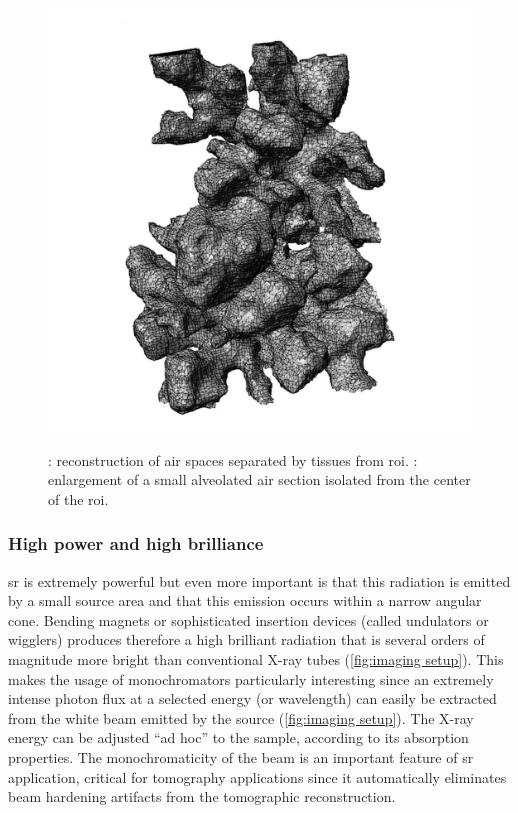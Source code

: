 \begin{figure}
{{			\includegraphics[width=\imsize]{img/Tsuda2008/Tsuda-09b}%
			\label{subfig:tsuda-09b}%
		}%
	}%
	\caption[Three-dimensional reconstruction of air spaces]{: reconstruction of \threed air spaces separated by tissues from \ac{roi}. : enlargement of a small alveolated air section isolated from the center of the \ac{roi}.}
	\label{fig:tsuda-09}
\end{figure}

\subsubsection{High power and high brilliance}
\ac{sr} is extremely powerful but even more important is that this radiation is emitted by a small source area and that this emission occurs within a narrow angular cone. Bending magnets or sophisticated insertion devices (called undulators or wigglers) produces therefore a high brilliant radiation that is several orders of magnitude more bright than conventional X-ray tubes (\autoref{fig:imaging setup}). This makes the usage of monochromators particularly interesting since an extremely intense photon flux at a selected energy (or wavelength) can easily be extracted from the white beam emitted by the source (\autoref{fig:imaging setup}). The X-ray energy can be adjusted ``ad hoc'' to the sample, according to its absorption properties. The monochromaticity of the beam is an important feature of \ac{sr} application, critical for tomography applications since it automatically eliminates beam hardening artifacts from the tomographic reconstruction.

